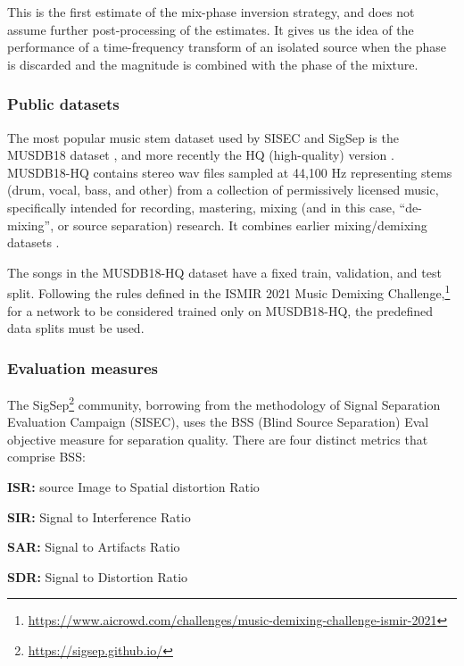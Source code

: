 \documentclass[report.tex]{subfiles}
\begin{document}
This is the first estimate of the mix-phase inversion strategy, and does not assume further post-processing of the estimates. It gives us the idea of the performance of a time-frequency transform of an isolated source when the phase is discarded and the magnitude is combined with the phase of the mixture.

\subsubsection{Public datasets}

The most popular music stem dataset used by SISEC and SigSep is the MUSDB18 dataset \parencite{musdb18}, and more recently the HQ (high-quality) version \parencite{musdb18hq}. MUSDB18-HQ contains stereo wav files sampled at 44,100 Hz representing stems (drum, vocal, bass, and other) from a collection of permissively licensed music, specifically intended for recording, mastering, mixing (and in this case, ``de-mixing'', or source separation) research. It combines earlier mixing/demixing datasets \parencite{sisec2016, otherdataset2}.

The songs in the MUSDB18-HQ dataset have a fixed train, validation, and test split. Following the rules defined in the ISMIR 2021 Music Demixing Challenge,\footnote{\url{https://www.aicrowd.com/challenges/music-demixing-challenge-ismir-2021}} for a network to be considered trained only on MUSDB18-HQ, the predefined data splits must be used.

\subsubsection{Evaluation measures}
\label{sec:evalbss}

The SigSep\footnote{\url{https://sigsep.github.io/}} community, borrowing from the methodology of Signal Separation Evaluation Campaign (SISEC), uses the BSS (Blind Source Separation) Eval \cite{bss} objective measure for separation quality. There are four distinct metrics that comprise BSS:

\begin{tight_itemize}
\item
	\textbf{ISR:} source Image to Spatial distortion Ratio
\item
	\textbf{SIR:} Signal to Interference Ratio
\item
	\textbf{SAR:} Signal to Artifacts Ratio
\item
	\textbf{SDR:} Signal to Distortion Ratio
\end{tight_itemize}
\end{document}
